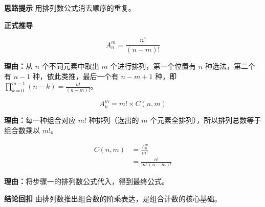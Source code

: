 \begin{proofbox}
	\textbf{\textcolor{CProof}{思路提示}}
	用排列数公式消去顺序的重复。

	\medskip
	\textbf{\textcolor{CProof}{正式推导}}
	\begin{description}[style=nextline, leftmargin=2.8em, labelsep=0.5em, itemsep=0.55em]
		\item[\textbf{步骤一（排列公式）：}]
			\[
				A_n^m = \frac{n!}{(n-m)!}
			\]
			\par\textbf{理由：}从 $n$ 个不同元素中取出 $m$ 个进行排列，第一个位置有 $n$ 种选法，第二个有 $n-1$ 种，依此类推，最后一个有 $n-m+1$ 种，即 $\displaystyle \prod_{k=0}^{m-1}(n-k)= \frac{n!}{(n-m)!}$。
		\item[\textbf{步骤二（组合关系）：}]
			\[
				A_n^m = m! \times C(n,m)
			\]
			\par\textbf{理由：}每一种组合对应 $m!$ 种排列（选出的 $m$ 个元素全排列），所以排列总数等于组合数乘以 $m!$。
		\item[\textbf{步骤三（代入约分）：}]
			\[
				\begin{aligned}
					C(n,m) &= \frac{A_n^m}{m!}\\ &= \frac{n!}{m!\,(n-m)!}
			\end{aligned}
			\]
			\par\textbf{理由：}将步骤一的排列数公式代入，得到最终公式。
	\end{description}

	\medskip
	\textbf{\textcolor{CProof}{结论回扣}}
	由排列数推出组合数的阶乘表达，是组合计数的核心基础。
\end{proofbox}
